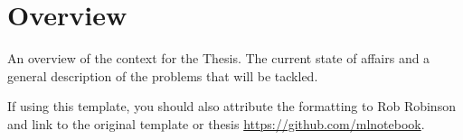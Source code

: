 \section{Overview}
\glsresetall

An overview of the context for the Thesis. The current state of affairs and a general description of the problems that will be tackled.

If using this template, you should also attribute the formatting to Rob Robinson \parencite{robinson2020thesis} and link to the original template or thesis \url{https://github.com/mlnotebook}.
